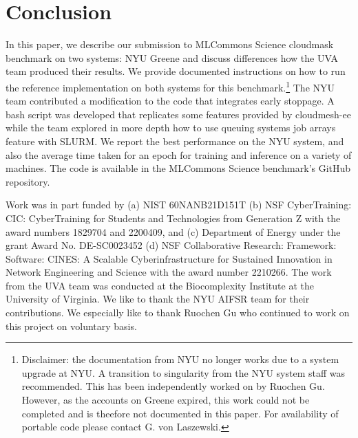 \documentclass[sigplan,screen]{acmart}
\begin{document}
\section{Conclusion}

In this paper, we describe our submission to MLCommons Science cloudmask benchmark on two systems: NYU Greene and discuss differences how the UVA team produced their results. We provide documented instructions on how to run the reference implementation on both systems for this benchmark.\footnote{Disclaimer: the documentation from NYU no longer works due to a system upgrade at NYU. A transition to singularity from the NYU system staff was recommended. This has been independently worked on by Ruochen Gu. However, as the accounts on Greene expired, this work could not be completed and is theefore not documented in this paper. For availability of portable code please contact G. von Laszewski.} 
The NYU team contributed a modification to the code that integrates early stoppage. A bash script was developed that replicates some features provided by cloudmesh-ee while the team explored in more depth how to use queuing systems job arrays feature with SLURM. We report the best performance on the NYU system, and also the average time taken for an epoch for training and inference on a variety of machines. The code is available in the MLCommons Science benchmark's GitHub repository.



\begin{acks}

  Work was in part funded by (a) NIST 60NANB21D151T (b) NSF
  CyberTraining: CIC: CyberTraining for Students and Technologies from
  Generation Z with the award numbers 1829704 and 2200409, and (c)
  Department of Energy under the grant Award No. DE-SC0023452 (d) NSF
  Collaborative Research: Framework: Software: CINES: A Scalable
  Cyberinfrastructure for Sustained Innovation in Network Engineering
  and Science with the award number 2210266. The work from the UVA
  team was conducted at the Biocomplexity Institute at
  the University of Virginia.  We like to thank the NYU AIFSR team for
  their contributions. We especially like to thank Ruochen Gu who
  continued to work on this project on voluntary basis.

\end{acks}



\end{document}
